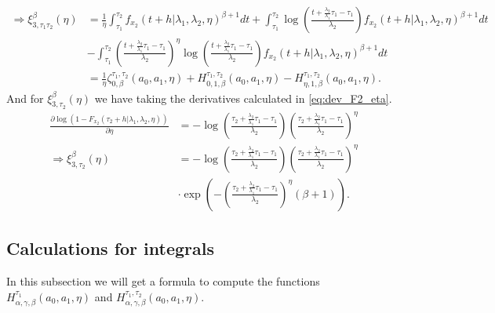 \documentclass{article}
\begin{document}
\begin{align*}
\Rightarrow  \xi_{3,\tau_1\tau_2}^{\beta}(\eta)&=\frac{1}{\eta} \int_{\tau_1}^{\tau_2}f_{x_2}(t+h|\lambda_1,\lambda_2,\eta)^{\beta+1}dt
+\int_{\tau_1}^{\tau_2}\log\left(\frac{t+\frac{\lambda_2}{\lambda_1}\tau_1-\tau_1}{\lambda_2}\right)f_{x_2}(t+h|\lambda_1,\lambda_2,\eta)^{\beta+1}dt
\\
&-\int_{\tau_1}^{\tau_2}\left(\frac{t+\frac{\lambda_2}{\lambda_1}\tau_1-\tau_1}{\lambda_2}\right)^{\eta}\log\left(\frac{t+\frac{\lambda_2}{\lambda_1}\tau_1-\tau_1}{\lambda_2}\right)f_{x_2}(t+h|\lambda_1,\lambda_2,\eta)^{\beta+1}dt 
\\
&=\frac{1}{\eta}\zeta_{0,\beta}^{\tau_1,\tau_2}(a_0,a_1,\eta)+H_{0,1,\beta}^{\tau_1,\tau_2}(a_0,a_1,\eta)-H_{\eta,1,\beta}^{\tau_1,\tau_2}(a_0,a_1,\eta).
\end{align*}
And for $\xi_{3,\tau_2}^{\beta}(\eta)$ we have taking the derivatives calculated in \eqref{eq:dev_F2_eta}.
\begin{align*}
\frac{\partial \log\left(1-F_{x_2}(\tau_2+h|\lambda_1,\lambda_2,\eta)\right)}{\partial \eta}&=-\log\left(\frac{\tau_2+\frac{\lambda_2}{\lambda_1}\tau_1-\tau_1}{\lambda_2}\right)\left(\frac{\tau_2+\frac{\lambda_2}{\lambda_1}\tau_1-\tau_1}{\lambda_2}\right)^{\eta}
\\
\Rightarrow  \xi_{3,\tau_2}^{\beta}(\eta)&=-\log\left(\frac{\tau_2+\frac{\lambda_2}{\lambda_1}\tau_1-\tau_1}{\lambda_2}\right)\left(\frac{\tau_2+\frac{\lambda_2}{\lambda_1}\tau_1-\tau_1}{\lambda_2}\right)^{\eta}
\\
&\cdot \exp\left(-\left(\frac{\tau_2+\frac{\lambda_2}{\lambda_1}\tau_1-\tau_1}{\lambda_2}\right)^{\eta}(\beta+1)\right).
\end{align*}
\subsection{Calculations for integrals}
In this subsection we will get a formula to compute the functions $H_{\alpha,\gamma,\beta}^{\tau_1}(a_0,a_1,\eta)$ and  $H_{\alpha,\gamma,\beta}^{\tau_1,\tau_2}(a_0,a_1,\eta)$.
\end{document}
